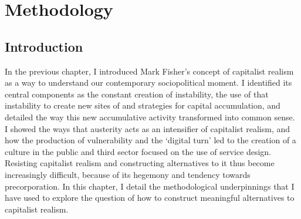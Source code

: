 \chapter{Methodology}
\label{3}

\section{Introduction}
\label{3-intro}


In the previous chapter, I introduced Mark Fisher’s concept of capitalist realism as a way to understand our contemporary sociopolitical moment. I identified its central components as the constant creation of instability, the use of that instability to create new sites of and strategies for capital accumulation, and detailed the way this new accumulative activity transformed into common sense. I showed the ways that austerity acts as an intensifier of capitalist realism, and how the production of vulnerability and the ‘digital turn’ led to the creation of a culture in the public and third sector focused on the use of service design. Resisting capitalist realism and constructing alternatives to it thus become increasingly difficult, because of its hegemony and tendency towards precorporation. In this chapter, I detail the methodological underpinnings that I have used to explore the question of how to construct meaningful alternatives to capitalist realism. 

